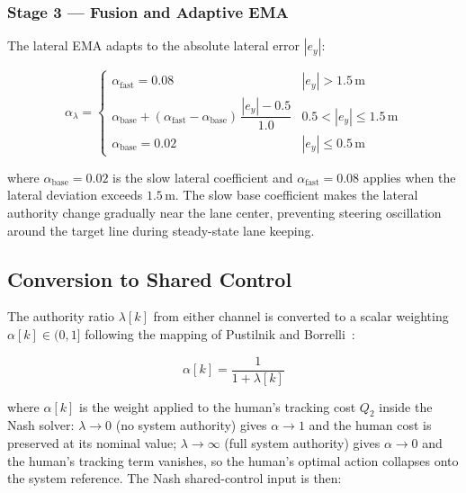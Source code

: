 \documentclass[12pt,a4paper,oneside]{report}
\begin{document}
\subsubsection{Stage 3 — Fusion and Adaptive EMA}

The lateral EMA adapts to the absolute lateral error $|e_y|$:

\begin{equation}
\alpha_\lambda = \begin{cases}
\alpha_{\mathrm{fast}} = 0.08 & |e_y| > 1.5\,\mathrm{m} \\[3pt]
\alpha_{\mathrm{base}} + (\alpha_{\mathrm{fast}} - \alpha_{\mathrm{base}})\,\dfrac{|e_y| - 0.5}{1.0} & 0.5 < |e_y| \leq 1.5\,\mathrm{m} \\[3pt]
\alpha_{\mathrm{base}} = 0.02 & |e_y| \leq 0.5\,\mathrm{m}
\end{cases}
\label{eq:lat_alpha_adaptive}
\end{equation}

where $\alpha_{\mathrm{base}} = 0.02$ is the slow lateral coefficient and $\alpha_{\mathrm{fast}} = 0.08$ applies when the lateral deviation exceeds $1.5\,\mathrm{m}$. The slow base coefficient makes the lateral authority change gradually near the lane center, preventing steering oscillation around the target line during steady-state lane keeping.

\subsection{Conversion to Shared Control}
\label{sec:authority_conversion}

The authority ratio $\lambda[k]$ from either channel is converted to a scalar weighting $\alpha[k] \in (0, 1]$ following the mapping of Pustilnik and Borrelli~\cite{pustilnikGeneralizedNashEquilibrium2025}:

\begin{equation}
\alpha[k] = \frac{1}{1 + \lambda[k]}
\label{eq:alpha_from_lambda}
\end{equation}

where $\alpha[k]$ is the weight applied to the human's tracking cost $Q_2$ inside the Nash solver: $\lambda \to 0$ (no system authority) gives $\alpha \to 1$ and the human cost is preserved at its nominal value; $\lambda \to \infty$ (full system authority) gives $\alpha \to 0$ and the human's tracking term vanishes, so the human's optimal action collapses onto the system reference. The Nash shared-control input is then:
\end{document}
